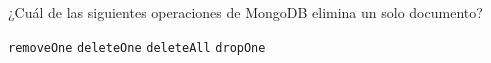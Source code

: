 \question[1] ¿Cuál de las siguientes operaciones de MongoDB elimina un solo documento?
\begin{choices}
\choice \texttt{removeOne}
\CorrectChoice \texttt{deleteOne}
\choice \texttt{deleteAll}
\choice \texttt{dropOne}
\end{choices}
